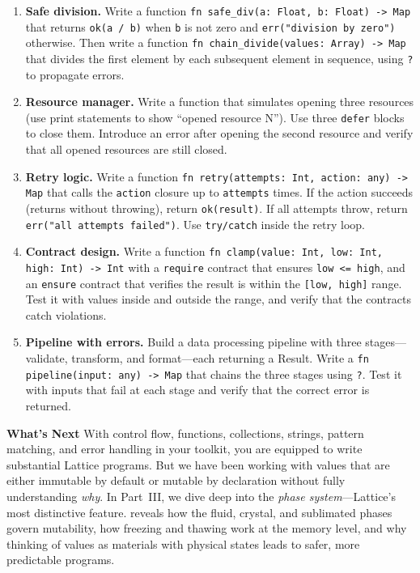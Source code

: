 \begin{enumerate}
  \item \textbf{Safe division.} Write a function \lstinline|fn safe_div(a: Float, b: Float) -> Map| that returns \lstinline|ok(a / b)| when \lstinline|b| is not zero and \lstinline|err("division by zero")| otherwise. Then write a function \lstinline|fn chain_divide(values: Array) -> Map| that divides the first element by each subsequent element in sequence, using \lstinline|?| to propagate errors.

  \item \textbf{Resource manager.} Write a function that simulates opening three resources (use print statements to show ``opened resource N''). Use three \lstinline|defer| blocks to close them. Introduce an error after opening the second resource and verify that all opened resources are still closed.

  \item \textbf{Retry logic.} Write a function \lstinline|fn retry(attempts: Int, action: any) -> Map| that calls the \lstinline|action| closure up to \lstinline|attempts| times. If the action succeeds (returns without throwing), return \lstinline|ok(result)|. If all attempts throw, return \lstinline|err("all attempts failed")|. Use \lstinline|try/catch| inside the retry loop.

  \item \textbf{Contract design.} Write a function \lstinline|fn clamp(value: Int, low: Int, high: Int) -> Int| with a \lstinline|require| contract that ensures \lstinline|low <= high|, and an \lstinline|ensure| contract that verifies the result is within the \lstinline|[low, high]| range. Test it with values inside and outside the range, and verify that the contracts catch violations.

  \item \textbf{Pipeline with errors.} Build a data processing pipeline with three stages---validate, transform, and format---each returning a Result. Write a \lstinline|fn pipeline(input: any) -> Map| that chains the three stages using \lstinline|?|. Test it with inputs that fail at each stage and verify that the correct error is returned.
\end{enumerate}


\bigskip
\noindent\textbf{What's Next}\quad
With control flow, functions, collections, strings, pattern matching, and error handling in your toolkit, you are equipped to write substantial Lattice programs. But we have been working with values that are either immutable by default or mutable by declaration without fully understanding \emph{why}. In Part~III, we dive deep into the \emph{phase system}---Lattice's most distinctive feature.  reveals how the fluid, crystal, and sublimated phases govern mutability, how freezing and thawing work at the memory level, and why thinking of values as materials with physical states leads to safer, more predictable programs.
